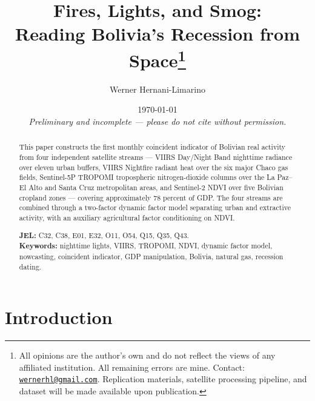 \documentclass[11pt,letterpaper]{article}
\title{\textbf{Fires, Lights, and Smog:\\ Reading Bolivia's Recession from Space}\thanks{All opinions are the author's own and do not reflect the views of any affiliated institution. All remaining errors are mine. Contact: \href{mailto:wernerhl@gmail.com}{\texttt{wernerhl@gmail.com}}. Replication materials, satellite processing pipeline, and dataset will be made available upon publication.}}
\author{Werner Hernani-Limarino}
\date{\today \\[4pt] \textit{Preliminary and incomplete --- please do not cite without permission.}}
\begin{document}
\maketitle

\begin{abstract}
\noindent
This paper constructs the first monthly coincident indicator of Bolivian real activity from four independent satellite streams --- VIIRS Day/Night Band nighttime radiance over eleven urban buffers, VIIRS Nightfire radiant heat over the six major Chaco gas fields, Sentinel-5P TROPOMI tropospheric nitrogen-dioxide columns over the La Paz--El Alto and Santa Cruz metropolitan areas, and Sentinel-2 NDVI over five Bolivian cropland zones --- covering approximately \num{78} percent of GDP. The four streams are combined through a two-factor dynamic factor model separating urban and extractive activity, with an auxiliary agricultural factor conditioning on NDVI. %
\vspace{0.5em}

\noindent \textbf{JEL:} C32, C38, E01, E32, O11, O54, Q15, Q35, Q43. \\
\noindent \textbf{Keywords:} nighttime lights, VIIRS, TROPOMI, NDVI, dynamic factor model, nowcasting, coincident indicator, GDP manipulation, Bolivia, natural gas, recession dating.
\end{abstract}

\thispagestyle{empty}

\newpage
\setcounter{page}{1}

\section{Introduction}
\end{document}
